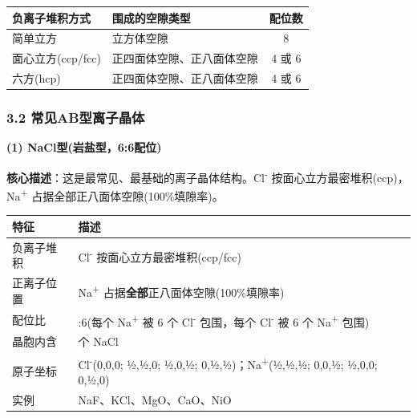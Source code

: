 \documentclass[a4paper,11pt]{ctexart}
\newcounter{none}
\newcommand{\箭}{\ensuremath{\rightarrow}}
\newcommand{\左箭}{\ensuremath{\leftarrow}}
\newcommand{\上箭}{\ensuremath{\uparrow}}
\newcommand{\下箭}{\ensuremath{\downarrow}}
\newcommand{\衡}{\ensuremath{\rightleftharpoons}}
\newcommand{\双箭}{\ensuremath{\leftrightarrow}}
\newcommand{\约等于}{\ensuremath{\approx}}
\newcommand{\小于等于}{\ensuremath{\leq}}
\newcommand{\大于等于}{\ensuremath{\geq}}
\newcommand{\不等于}{\ensuremath{\neq}}
\newcommand{\西格马}{\ensuremath{\sigma}}
\newcommand{\派}{\ensuremath{\pi}}
\begin{document}
{\def\LTcaptype{none} %
\begin{longtable}[]{@{}llc@{}}
\toprule\noalign{}
负离子堆积方式 & 围成的空隙类型 & 配位数 \\
\midrule\noalign{}
\endhead
\bottomrule\noalign{}
\endlastfoot
简单立方 & 立方体空隙 & 8 \\
面心立方(ccp/fcc) & 正四面体空隙、正八面体空隙 & 4 或 6 \\
六方(hcp) & 正四面体空隙、正八面体空隙 & 4 或 6 \\
\end{longtable}
}

\subsubsection{3.2 常见AB型离子晶体}\label{ux5e38ux89c1abux578bux79bbux5b50ux6676ux4f53}

\textbf{(1) NaCl型(岩盐型，6:6配位)}

\textbf{核心描述}：这是最常见、最基础的离子晶体结构。Cl\textsuperscript{-} 按面心立方最密堆积(ccp)，Na\textsuperscript{+} 占据全部正八面体空隙(100\%填隙率)。

{\def\LTcaptype{none} %
\begin{longtable}[]{@{}
  >{\raggedright\arraybackslash}p{}
  >{\raggedright\arraybackslash}p{}@{}}
\toprule\noalign{}
\begin{minipage}[b]{\linewidth}\raggedright
特征
\end{minipage} & \begin{minipage}[b]{\linewidth}\raggedright
描述
\end{minipage} \\
\midrule\noalign{}
\endhead
\bottomrule\noalign{}
\endlastfoot
负离子堆积 & Cl\textsuperscript{-} 按面心立方最密堆积(ccp/fcc) \\
正离子位置 & Na\textsuperscript{+} 占据\textbf{全部}正八面体空隙(100\%填隙率) \\
配位比 & 6:6(每个 Na\textsuperscript{+} 被 6 个 Cl\textsuperscript{-} 包围，每个 Cl\textsuperscript{-} 被 6 个 Na\textsuperscript{+} 包围) \\
晶胞内含 & 4 个 NaCl \\
原子坐标 & Cl\textsuperscript{-}(0,0,0; ½,½,0; ½,0,½; 0,½,½)；Na\textsuperscript{+}(½,½,½; 0,0,½; ½,0,0; 0,½,0) \\
实例 & NaF、KCl、MgO、CaO、NiO \\
\end{longtable}
}
\end{document}
